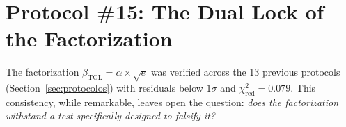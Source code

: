 \documentclass[12pt,a4paper,twoside]{article}
\newcommand{\betatgl}{\beta_{\!\scriptscriptstyle\mathrm{TGL}}}
\begin{document}
%
%
%
%
%
%
%



\section{Protocol \#15: The Dual Lock of the Factorization}
\label{sec:protocolo15}

The factorization $\betatgl = \alpha \times \sqrt{e}$ was verified across the 13 previous protocols (Section~\ref{sec:protocolos}) with residuals below $1\sigma$ and $\chi^2_{\text{red}} = 0.079$. This consistency, while remarkable, leaves open the question: \textit{does the factorization withstand a test specifically designed to falsify it?}
\end{document}
